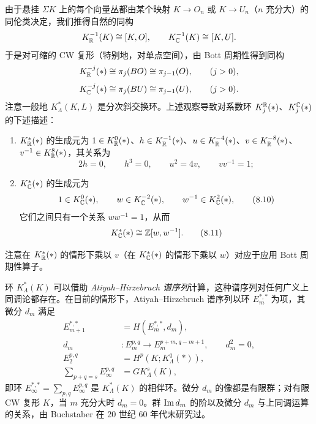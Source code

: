 由于悬挂 $\Sigma K$ 上的每个向量丛都由某个映射 $K\to O_n$ 或 $K\to U_n$（$n$ 充分大）的同伦类决定，我们推得自然的同构
\[
K_{\mathbb{R}}^{-1}(K)\cong[K,O],\qquad K_{\mathbb{C}}^{-1}(K)\cong[K,U].
\]
于是对可缩的 CW 复形（特别地，对单点空间），由 Bott 周期性得到同构
\[
K_{\mathbb{R}}^{-j}(*)\cong\pi_j(BO)\cong\pi_{j-1}(O),\qquad (j>0),
\]
\[
K_{\mathbb{C}}^{-j}(*)\cong\pi_j(BU)\cong\pi_{j-1}(U),\qquad (j>0).
\]
注意一般地 $K_\Lambda^*(K,L)$ 是分次斜交换环。上述观察导致对系数环 $K_j^{\mathbb{R}}(*)$、$K_j^{\mathbb{C}}(*)$ 的下述描述：

\begin{enumerate}[label=\arabic*.,leftmargin=2em]
\item $K_{\mathbb{R}}^*(*)$ 的生成元为 $1\in K_{\mathbb{R}}^0(*)$、$h\in K_{\mathbb{R}}^{-1}(*)$、$u\in K_{\mathbb{R}}^{-4}(*)$、$v\in K_{\mathbb{R}}^{-8}(*)$、$v^{-1}\in K_{\mathbb{R}}^8(*)$，其关系为
\begin{equation}
2h=0,\qquad h^3=0,\qquad u^2=4v,\qquad vv^{-1}=1; \tag{8.9}
\end{equation}

\item $K_{\mathbb{C}}^*(*)$ 的生成元为
\begin{equation}
1\in K_{\mathbb{C}}^0(*),\qquad w\in K_{\mathbb{C}}^{-2}(*),\qquad w^{-1}\in K_{\mathbb{C}}^2(*), \tag{8.10}
\end{equation}
它们之间只有一个关系 $ww^{-1}=1$，从而
\begin{equation}
K_{\mathbb{C}}^*(*)\cong\mathbb{Z}[w,w^{-1}]. \tag{8.11}
\end{equation}
\end{enumerate}

注意在 $K_{\mathbb{R}}^*(*)$ 的情形下乘以 $v$（在 $K_{\mathbb{C}}^*(*)$ 的情形下乘以 $w$）对应于应用 Bott 周期性算子。

环 $K_\Lambda^*(K)$ 可以借助 \emph{Atiyah--Hirzebruch 谱序列}计算，这种谱序列对任何广义上同调论都存在。在目前的情形下，Atiyah--Hirzebruch 谱序列以环 $E_m^{*,*}$ 为项，其微分 $d_m$ 满足
\begin{equation}
\begin{aligned}
E_{m+1}^{*,*}&=H(E_m^{*,*},d_m),\\
d_m&:E_m^{p,q}\longrightarrow E_m^{p+m,q-m+1},\qquad d_m^2=0,\\
E_2^{p,q}&=H^p(K;K_\Lambda^q(*)),\\
\sum_{p+q=s}E_\infty^{p,q}&=GK_\Lambda^s(K),
\end{aligned}
\tag{8.12}
\end{equation}
即环 $E_\infty^{*,*}=\sum\limits_{p,q}E_\infty^{p,q}$ 是 $K_\Lambda^*(K)$ 的相伴环。微分 $d_m$ 的像都是有限群；对有限 CW 复形 $K$，当 $m$ 充分大时 $d_m=0$。群 $\operatorname{Im} d_m$ 的阶以及微分 $d_m$ 与上同调运算的关系，由 Buchstaber 在 20 世纪 60 年代末研究过。

